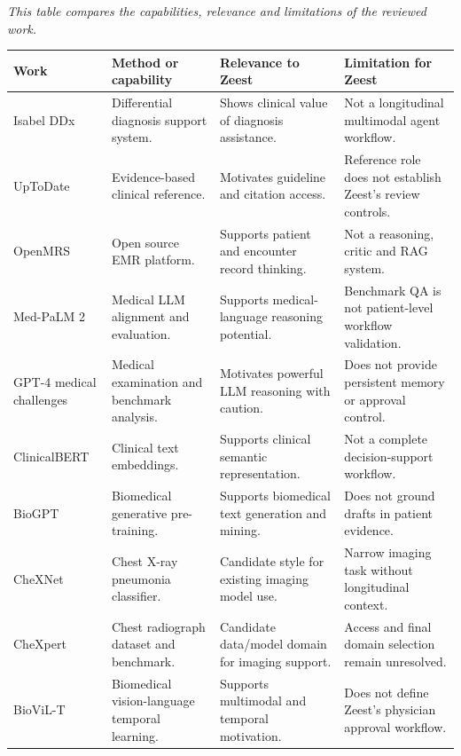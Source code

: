 \begin{reporttable}
\centering
\small
\setlength{\tabcolsep}{4pt}
\caption{Summary of literature review.}
\label{tab:fatima:literature-summary}
{\small\itshape This table compares the capabilities, relevance and limitations of the reviewed work.\par}
\smallskip
\begin{tabular}{|p{}|p{}|p{}|p{}|}
\hline
Work & Method or capability & Relevance to Zeest & Limitation for Zeest \\ \hline
Isabel DDx \cite{zeestB:isabel} & Differential diagnosis support system. & Shows clinical value of diagnosis assistance. & Not a longitudinal multimodal agent workflow. \\ \hline
UpToDate \cite{zeestB:uptodate} & Evidence-based clinical reference. & Motivates guideline and citation access. & Reference role does not establish Zeest's review controls. \\ \hline
OpenMRS \cite{zeestB:openmrs} & Open source EMR platform. & Supports patient and encounter record thinking. & Not a reasoning, critic and RAG system. \\ \hline
Med-PaLM 2 \cite{zeestB:medpalm2} & Medical LLM alignment and evaluation. & Supports medical-language reasoning potential. & Benchmark QA is not patient-level workflow validation. \\ \hline
GPT-4 medical challenges \cite{zeestA:noriMedical} & Medical examination and benchmark analysis. & Motivates powerful LLM reasoning with caution. & Does not provide persistent memory or approval control. \\ \hline
ClinicalBERT \cite{zeestB:clinicalbert} & Clinical text embeddings. & Supports clinical semantic representation. & Not a complete decision-support workflow. \\ \hline
BioGPT \cite{zeestB:biogpt} & Biomedical generative pre-training. & Supports biomedical text generation and mining. & Does not ground drafts in patient evidence. \\ \hline
CheXNet \cite{zeestB:chexnet} & Chest X-ray pneumonia classifier. & Candidate style for existing imaging model use. & Narrow imaging task without longitudinal context. \\ \hline
CheXpert \cite{zeestB:chexpert} & Chest radiograph dataset and benchmark. & Candidate data/model domain for imaging support. & Access and final domain selection remain unresolved. \\ \hline
BioViL-T \cite{zeestB:biovilt} & Biomedical vision-language temporal learning. & Supports multimodal and temporal motivation. & Does not define Zeest's physician approval workflow. \\ \hline

\end{tabular}
\end{reporttable}
